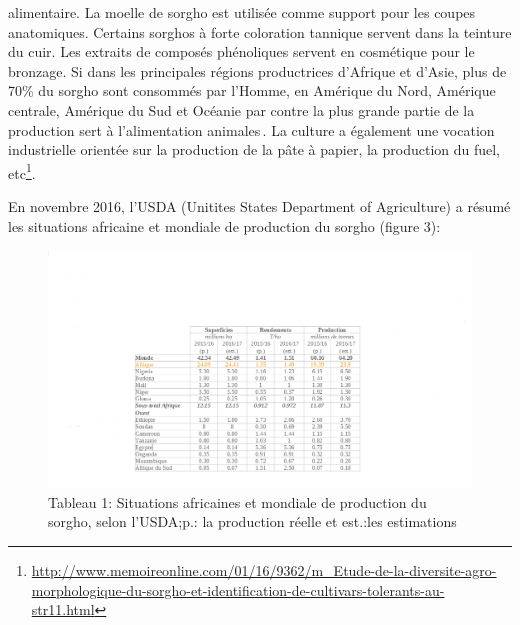 \documentclass[a4paper,11pt]{article}
\begin{document}
alimentaire. La moelle de sorgho est utilisée comme support pour les
coupes anatomiques. Certains sorghos à forte coloration tannique
servent dans la teinture du cuir. Les extraits de composés phénoliques
servent en cosmétique pour le bronzage. Si dans les principales
régions productrices d’Afrique et d’Asie, plus de 70\% du sorgho sont
consommés par l’Homme, en Amérique du Nord, Amérique centrale,
Amérique du Sud et Océanie par contre la plus grande partie de la
production sert à l’alimentation animales\,\cite{BARRO_KONDOMBO_2010}. La
culture a également une vocation industrielle orientée sur la
production de la pâte à papier, la production du fuel,
etc\footnote{\url{http://www.memoireonline.com/01/16/9362/m_Etude-de-la-diversite-agro-morphologique-du-sorgho-et-identification-de-cultivars-tolerants-au-str11.html}}.

En novembre 2016, l’USDA (Unitites States Department of Agriculture) a résumé les situations africaine et mondiale de production du sorgho (figure 3):


\begin{figure}%
  \begin{center}
   \includegraphics[width=14cm]{images/WorldSorghumStatisticsUsda}
  \end{center}
  \caption{Tableau 1: Situations africaines et mondiale de production du sorgho, selon l’USDA;p.:
    la production réelle et est.:les estimations}
\end{figure}
\end{document}
